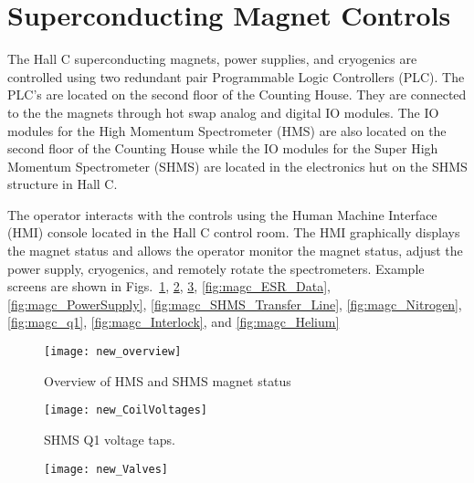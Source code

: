 \section{Superconducting Magnet Controls}

The Hall C superconducting magnets, power supplies, and cryogenics are
controlled using two redundant pair Programmable Logic Controllers
(PLC). The PLC's are located on the second floor of the Counting
House. They are connected to the the magnets through hot swap analog
and digital IO modules. The IO modules for the High Momentum
Spectrometer (HMS) are also located on the second floor of the
Counting House while the IO modules for the Super High Momentum
Spectrometer (SHMS) are located in the electronics hut on the SHMS
structure in Hall C.

The operator interacts with the controls using the Human Machine
Interface (HMI) console located in the Hall C control room. The HMI
graphically displays the magnet status and allows the operator monitor
the magnet status, adjust the power supply, cryogenics, and remotely
rotate the spectrometers.  Example screens are shown in
Figs.~\ref{fig:magc_overview}, \ref{fig:magc_coilvoltages},
\ref{fig:magc_valves}, \ref{fig:magc_ESR_Data},
\ref{fig:magc_PowerSupply}, \ref{fig:magc_SHMS_Transfer_Line},
\ref{fig:magc_Nitrogen}, \ref{fig:magc_q1}, \ref{fig:magc_Interlock},
and \ref{fig:magc_Helium}


\begin{figure}
\begin{center}
\texttt{[image: new\_overview]}
\caption{\label{fig:magc_overview}Overview of HMS and SHMS magnet status}
\end{center}
\end{figure}

\begin{figure}
\begin{center}
\texttt{[image: new\_CoilVoltages]}
\caption{\label{fig:magc_coilvoltages}SHMS Q1 voltage taps.}
\end{center}
\end{figure}


\begin{figure}
\begin{center}
\texttt{[image: new\_Valves]}
\caption{\label{fig:magc_valves}}
\end{center}
\end{figure}


